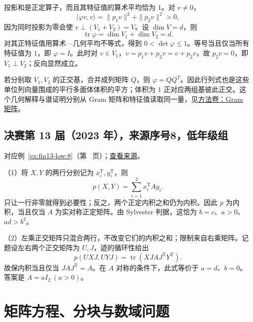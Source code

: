 \documentclass[UTF8,12pt,a4paper,fontset=fandol]{ctexart}
\begin{document}
\begin{solve}

投影和是正定算子，而且其特征值的算术平均恰为 $1$。对 $v\ne0$，
\[
\langle\varphi v,v\rangle=\|p_1v\|^2+\|p_2v\|^2>0,
\]
因为同时投影为零会使 $v\perp(V_1+V_2)=V$。设 $\dim V=d$，则
\[
\operatorname{tr}\varphi=\dim V_1+\dim V_2=d.
\]
对其正特征值用算术---几何平均不等式，得到 $0<\det\varphi\leq1$。等号当且仅当所有特征值为 $1$，即 $\varphi=I$。此时对 $v\in V_1$，$v=p_1v+p_2v=v+p_2v$，故 $p_2v=0$，即 $V_1\perp V_2$；反向显然成立。

\end{solve}

\begin{remark}[方法与条件]

若分别取 $V_1,V_2$ 的正交基，合并成列矩阵 $Q$，则 $\varphi=QQ^T$。因此行列式也是这些单位列向量围成的平行多面体体积的平方；体积为 $1$ 正对应两组基彼此正交。这个几何解释与谱证明分别从 Gram 矩阵和特征值读取同一量，见\hyperref[app:linear-gram]{方法卷：Gram 矩阵}。

\end{remark}

\subsection{决赛第 13 届（2023 年），来源序号8，低年级组}\label{ans:fin13-low:8}\label{pr:fin13-low:8}

对应例~\ref{ex:fin13-low:8}（第~\pageref{ex:fin13-low:8} 页）；\href{https://github.com/lzxcr/cmc-mathematics/blob/64916fa1fdbc3e444a652eca204d5669058ee321/src/problems/finals/13/08.md}{查看来源}。

\begin{solve}

（1）将 $X,Y$ 的两行分别记为 $x_i^{\mathrm T},y_i^{\mathrm T}$，则
\[
p(X,Y)=\sum_{i=1}^2x_i^{\mathrm T}Ay_i.
\]
只让一行非零就得到必要性；反之，两个正定内积之和仍为内积。因此 $p$ 为内积，当且仅当 $A$ 为实对称正定矩阵。由 Sylvester 判据，这恰为 $b=c$、$a>0$、$ad>b^2$。

（2）左乘正交矩阵只混合两行，不改变它们的内积之和；限制来自右乘矩阵。记题设左右两个正交矩阵为 $U,J$，迹的循环性给出
\[
p(UXJ,UYJ)=\operatorname{tr}(XJAJ^{\mathrm T}Y^{\mathrm T}).
\]
故保内积当且仅当 $JAJ^{\mathrm T}=A$。在 $A$ 对称的条件下，此式等价于 $a=d$、$b=0$。答案是 $\boxed{A=aI_2\ (a>0)}$。

\end{solve}

\section{矩阵方程、分块与数域问题}
\end{document}
